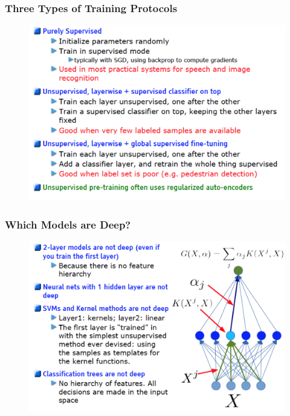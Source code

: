 \documentclass{beamer}
\begin{document}
\begin{frame}
\frametitle{Three Types of Training Protocols}
\begin{figure}
      \includegraphics[width=1\textwidth]{figs/intro8.png}
\end{figure}
\end{frame}

\begin{frame}
\frametitle{Which Models are Deep?}
\begin{figure}
      \includegraphics[width=1\textwidth]{figs/intro9.png}
\end{figure}
\end{frame}
\end{document}
